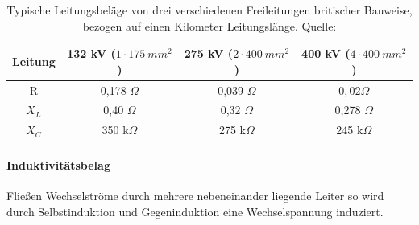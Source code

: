 \setlength{\tabcolsep}{10pt}
\renewcommand{\arraystretch}{1.5}
\begin{table}[tbhn]
\begin{center}
\noindent
\begin{tabular}{|c|ccc|}
\hline 
Leitung & 132 kV ($1\cdot 175\ mm^2$) & 275 kV ($2\cdot 400\ mm^2$) & 400 kV ($4\cdot 400\ mm^2$) \\ 
\hline 
R & 0,178 $\Omega$ & 0,039 $\Omega$ & $0,02 \Omega$ \\ 

$X_L$ & 0,40 $\Omega$ & 0,32 $\Omega$ & 0,278 $\Omega$ \\ 

$X_C$ & 350 k$\Omega$ & 275 k$\Omega$ & 245 k$\Omega$ \\ 
\hline 
\end{tabular} 
\end{center}
\caption{Typische Leitungsbeläge von drei verschiedenen Freileitungen britischer Bauweise, bezogen auf einen Kilometer Leitungslänge. Quelle: \cite{Harrison}}
\label{tab:freileitung}
\end{table}

\paragraph{Induktivitätsbelag}

Fließen Wechselströme durch mehrere nebeneinander liegende Leiter so wird durch Selbstinduktion und Gegeninduktion eine Wechselspannung induziert.

